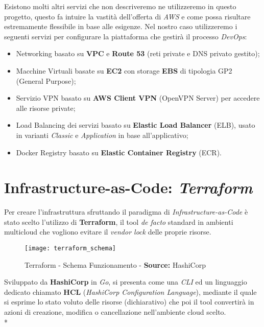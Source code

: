 \documentclass[../main.tex]{subfiles}
\begin{document}
    	    Esistono molti altri servizi che non descriveremo ne utilizzeremo in questo progetto, questo fa intuire la vastità dell'offerta di \emph{AWS} e come possa risultare estremamente flessibile in base alle esigenze. Nel nostro caso utilizzeremo i seguenti servizi per configurare la piattaforma che gestirà il processo \emph{DevOps}:
    	    \begin{itemize}
    	        \item Networking basato su \textbf{VPC} e \textbf{Route 53} (reti private e DNS privato gestito);
    	        \item Macchine Virtuali basate su \textbf{EC2} con storage \textbf{EBS} di tipologia GP2 (General Purpose);
    	        \item Servizio VPN basato su \textbf{AWS Client VPN} (OpenVPN Server) per accedere alle risorse private;
    	        \item Load Balancing dei servizi basato su \textbf{Elastic Load Balancer} (ELB), usato in varianti \emph{Classic} e \emph{Application} in base all'applicativo;
    	        \item Docker Registry basato su \textbf{Elastic Container Registry} (ECR).
    	        \end{itemize}
    	
    	\section{Infrastructure-as-Code: \emph{Terraform}}
    	
    	    Per creare l'infrastruttura sfruttando il paradigma di \emph{Infrastructure-as-Code} è stato scelto l'utilizzo di \textbf{Terraform}\cite{terraform}, il tool \emph{de facto} standard in ambienti multicloud che vogliono evitare il \emph{vendor lock} delle proprie risorse.
    	    
    	    \begin{figure}[H]
    			\centering
    			\texttt{[image: terraform\_schema]}
    			\caption{Terraform - Schema Funzionamento - \textbf{Source:} HashiCorp}
    			\label{fig:terraform_schema}
    	    \end{figure}
    	    
    	    Sviluppato da \textbf{HashiCorp} in \emph{Go}, si presenta come una \emph{CLI} ed un linguaggio dedicato chiamato \textbf{HCL} (\emph{HashiCorp Configuration Language}), mediante il quale si esprime lo stato voluto delle risorse (dichiarativo) che poi il tool convertirà in azioni di creazione, modifica o cancellazione nell'ambiente cloud scelto.\\*
    	    
\end{document}
